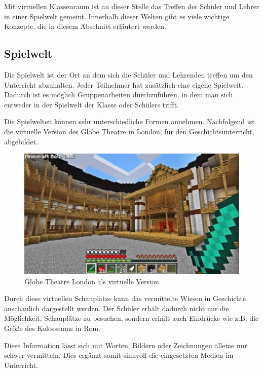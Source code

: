 Mit virtuellen Klassenraum ist an dieser Stelle das Treffen der Schüler und Lehrer in einer Spielwelt gemeint.
Innerhalb dieser Welten gibt es viele wichtige Konzepte, die in diesem Abschnitt erläutert werden.

\subsection{Spielwelt}

Die Spielwelt ist der Ort an dem sich die Schüler und Lehrenden treffen um den Unterricht abzuhalten. Jeder Teilnehmer hat zusätzlich eine eigene Spielwelt. Dadurch ist es möglich Gruppenarbeiten durchzuführen, in dem man sich entweder in der Spielwelt der Klasse oder Schülers trifft.

Die Spielwelten können sehr unterschiedliche Formen annehmen. Nachfolgend ist die virtuelle Version des Globe Theatre in London, für den Geschichtsunterricht, abgebildet.

\begin{figure}[ht]
	\centering
	\includegraphics[width=\textwidth,height=\textheight,keepaspectratio]{images/GlobeTheatreLondon.png}
	\caption{Globe Theatre London als virtuelle Version \cite{EdutopiaIdeas}}
	\label{globeTheatreLondon}
\end{figure}

Durch diese virtuellen Schauplätze kann das vermittelte Wissen in Geschichte anschaulich dargestellt werden. Der Schüler erhält dadurch nicht nur die Möglichkeit, Schauplätze zu besuchen, sondern erhält auch Eindrücke wie z.B. die Größe des Kolosseums in Rom. \cite{EdutopiaIdeas}

Diese Information lässt sich mit Worten, Bildern oder Zeichnungen alleine nur schwer vermitteln. Dies ergänzt somit sinnvoll die eingesetzten Medien im Unterricht.

